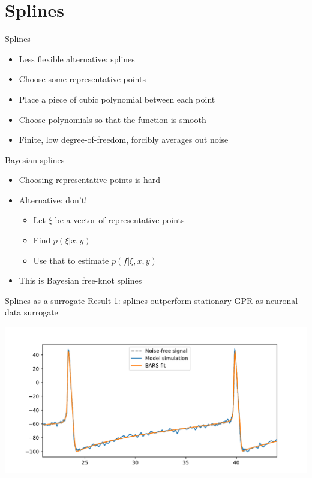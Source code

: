 \documentclass[presentation]{beamer}
\begin{document}
\section{Splines}
\label{sec:orge0d744f}
\begin{frame}[<+->][label={sec:org5e9bf71}]{Splines}
\begin{itemize}
\item Less flexible alternative: splines
\item Choose some representative points
\item Place a piece of cubic polynomial between each point
\item Choose polynomials so that the function is smooth
\item Finite, low degree-of-freedom, forcibly averages out noise
\end{itemize}
\end{frame}
\begin{frame}[<+->][label={sec:orgbd93a6f}]{Bayesian splines}
\begin{itemize}
\item Choosing representative points is hard
\item Alternative: don't!
\begin{itemize}
\item Let \(\xi\) be a vector of representative points
\item Find \(p(\xi|x,y)\)
\item Use that to estimate \(p(f | \xi, x, y)\)
\end{itemize}
\item This is Bayesian free-knot splines
\end{itemize}
\end{frame}
\begin{frame}[label={sec:org4614494}]{Splines as a surrogate}
Result 1: splines outperform stationary GPR as neuronal data surrogate

\begin{center}
\includegraphics[width=.9\linewidth]{./bars.pdf}
\end{center}
\end{frame}
\end{document}
